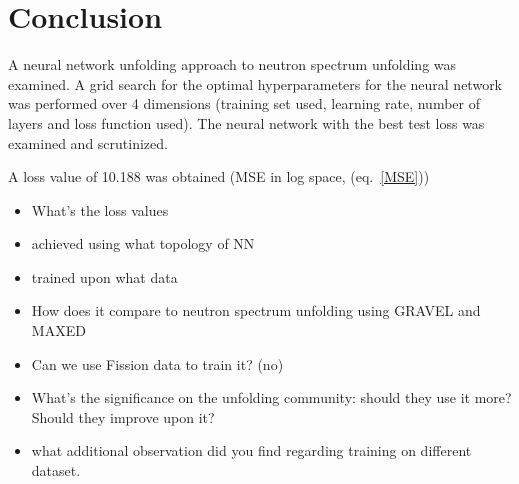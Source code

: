 \documentclass[a4paper, 12pt]{article}
\begin{document}
\section{Conclusion}
A neural network unfolding approach to neutron spectrum unfolding was examined. A grid search for the optimal hyperparameters for the neural network was performed over 4 dimensions (training set used, learning rate, number of layers and loss function used). The neural network with the best test loss was examined and scrutinized.

A loss value of 10.188 was obtained (MSE in log space, (eq.~\ref{MSE}))

\begin{itemize}
    \item What's the loss values
    \item achieved using what topology of NN
    \item trained upon what data
    \item How does it compare to neutron spectrum unfolding using GRAVEL and MAXED
    \item Can we use Fission data to train it? (no)
    \item What's the significance on the unfolding community: should they use it more? Should they improve upon it?
    \item what additional observation did you find regarding training on different dataset.
\end{itemize}



\end{document}

